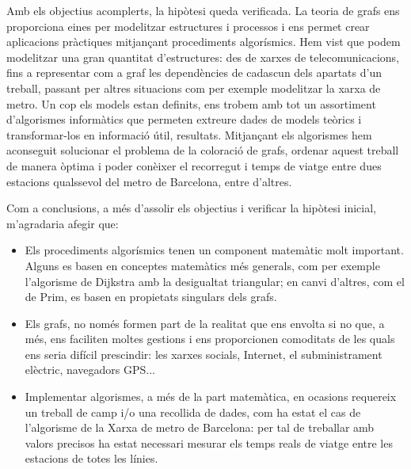 \documentclass[a4, 12pt, catalan]{report}
\newcounter{propietat}[subsection]
\begin{document}
Amb els objectius acomplerts, la hipòtesi queda verificada. La teoria de grafs ens proporciona eines per modelitzar estructures i processos i ens permet crear aplicacions pràctiques mitjançant procediments algorísmics. Hem vist que podem modelitzar una gran quantitat d'estructures: des de xarxes de telecomunicacions, fins a representar com a graf les dependències de cadascun dels apartats d'un treball, passant per altres situacions com per exemple modelitzar la xarxa de metro. Un cop els models estan definits, ens trobem amb tot un assortiment d'algorismes informàtics que permeten extreure dades de models teòrics i transformar-los en informació útil, resultats. Mitjançant els algorismes hem aconseguit solucionar el problema de la coloració de grafs, ordenar aquest treball de manera òptima i poder conèixer el recorregut i temps de viatge entre dues estacions qualssevol del metro de Barcelona, entre d'altres.

Com a conclusions, a més d'assolir els objectius i verificar la hipòtesi inicial, m'agradaria afegir que:
\begin{itemize} 
  \item Els procediments algorísmics tenen un component matemàtic molt important. Alguns es basen en conceptes matemàtics més generals, com per exemple l'algorisme de Dijkstra amb la desigualtat triangular; en canvi d'altres, com el de Prim, es basen en propietats singulars dels grafs.
  \item Els grafs, no només formen part de la realitat que ens envolta si no que, a més, ens faciliten moltes gestions i ens proporcionen comoditats de les quals ens seria difícil prescindir: les xarxes socials, Internet, el subministrament elèctric, navegadors GPS...  
  \item Implementar algorismes, a més de la part matemàtica, en ocasions requereix un treball de camp i/o una recollida de dades, com ha estat el cas de l'algorisme de la Xarxa de metro de Barcelona: per tal de treballar amb valors precisos ha estat necessari mesurar els temps reals de viatge entre les estacions de totes les línies.

\end{itemize}
\end{document}
